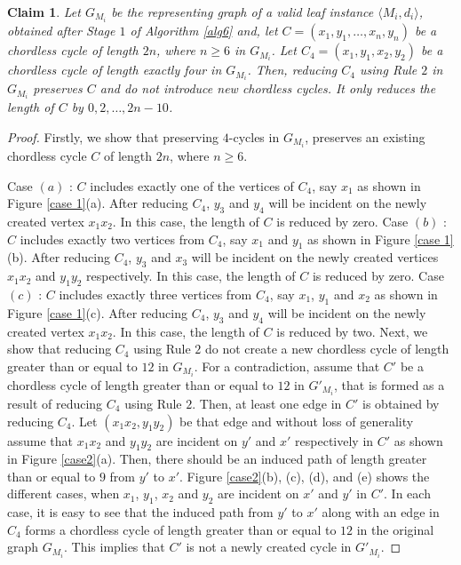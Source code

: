 \documentclass[review, 1p]{elsarticle}
\newtheorem{claim}{Claim}
\begin{document}
\begin{claim} \label{claim2} 
Let $G_{M_{i}}$ be the representing graph of a valid leaf instance $ \langle M_{i},d_{i} \rangle$, obtained after Stage $1$ of Algorithm \ref{alg6} and, let $C=(x_{1},y_{1},\ldots, x_{n},y_{n})$ be a chordless cycle of length $2n$, where $n \geq 6$ in $G_{M_{i}}$. Let $C_{4}= (x_{1},y_{1},x_{2},y_{2})$ be a chordless cycle of length exactly four in $G_{M_{i}}$. Then, reducing $C_{4}$ using Rule $2$ in $G_{M_{i}}$ preserves $C$ and do not introduce new chordless cycles. It only reduces the length of $C$ by $0, 2, \ldots, 2n-10$.
\end{claim} 
\begin{proof}
Firstly, we show that preserving $4$-cycles in $G_{M_{i}}$, preserves an existing chordless cycle $C$ of length $2n$, where $n \geq 6$.   

\noindent Case $(a)$ : $C$ includes exactly one of the vertices of $C_{4}$, say $x_{1}$ as shown in Figure \ref{case 1}(a). After reducing $C_{4}$, $y_{3}$ and $y_{4}$ will be incident on the newly created vertex $x_{1}x_{2}$. In this case, the length of $C$ is reduced by zero. \newline 
Case $(b)$ : $C$ includes exactly two vertices from $C_{4}$, say $x_{1}$ and $y_{1}$ as shown in Figure \ref{case 1}(b). After reducing $C_{4}$, $y_{3}$ and $x_{3}$ will be incident on the newly created vertices $x_{1}x_{2}$ and $y_{1}y_{2}$ respectively. In this case, the length of $C$ is reduced by zero. \newline 
Case $(c)$ : $C$ includes exactly three vertices from $C_{4}$, say $x_{1}$, $y_{1}$ and $x_{2}$ as shown in Figure \ref{case 1}(c). After reducing $C_{4}$, $y_{3}$ and $y_{4}$ will be incident on the newly created vertex $x_{1}x_{2}$. In this case, the length of $C$ is reduced by two. \newline 
Next, we show that reducing $C_{4}$ using Rule $2$ do not create a new chordless cycle of length greater than or equal to $12$ in $G_{M_{i}}$. For a contradiction, assume that $C'$ be a chordless cycle of length greater than or equal to $12$ in $G'_{M_{i}}$, that is formed as a result of reducing $C_{4}$ using Rule $2$. Then, at least one edge in $C'$ is obtained by reducing $C_{4}$. Let $(x_{1}x_{2},y_{1}y_{2})$ be that edge and without loss of generality assume that $x_{1}x_{2}$ and $y_{1}y_{2}$ are incident on $y'$ and $x'$ respectively in $C'$ as shown in Figure \ref{case2}(a). Then, there should be an induced path of length greater than or equal to $9$ from  $y'$ to $x'$. Figure \ref{case2}(b), (c), (d), and (e) shows the different cases, when $x_{1}$, $y_{1}$, $x_{2}$ and $y_{2}$ are incident on $x'$ and $y'$ in $C'$. In each case, it is easy to see that the induced path from $y'$ to $x'$ along with an edge in $C_{4}$ forms a chordless cycle of length greater than or equal to $12$ in the original graph $G_{M_{i}}$. This implies that $C'$ is not a newly created cycle in $G'_{M_{i}}$.
\end{proof}
\end{document}
